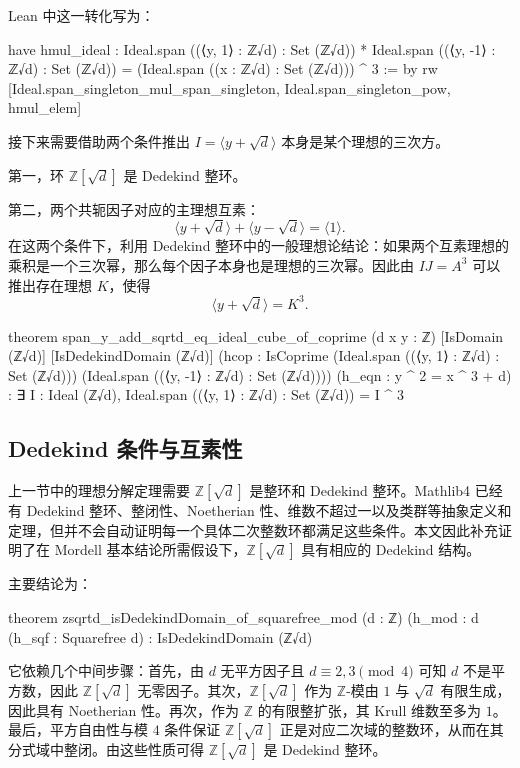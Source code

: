 Lean 中这一转化写为：
\begin{leanlisting}
have hmul_ideal :
    Ideal.span ({(⟨y, 1⟩ : ℤ√d)} : Set (ℤ√d)) *
      Ideal.span ({(⟨y, -1⟩ : ℤ√d)} : Set (ℤ√d)) =
        (Ideal.span ({(x : ℤ√d)} : Set (ℤ√d))) ^ 3 := by
  rw [Ideal.span_singleton_mul_span_singleton,
      Ideal.span_singleton_pow,
      hmul_elem]
\end{leanlisting}

接下来需要借助两个条件推出 \(I=\langle y+\sqrt d\rangle\) 本身是某个理想的三次方。

第一，环 \(\mathbb Z[\sqrt d]\) 是 Dedekind 整环。

第二，两个共轭因子对应的主理想互素：
\[
\langle y+\sqrt d\rangle+\langle y-\sqrt d\rangle=\langle 1\rangle.
\]
在这两个条件下，利用 Dedekind 整环中的一般理想论结论：如果两个互素理想的乘积是一个三次幂，那么每个因子本身也是理想的三次幂。因此由 \(IJ=A^3\) 可以推出存在理想 \(K\)，使得
\[
\langle y+\sqrt d\rangle=K^3.
\]

\begin{leanlisting}
theorem span_y_add_sqrtd_eq_ideal_cube_of_coprime
    (d x y : ℤ) [IsDomain (ℤ√d)] [IsDedekindDomain (ℤ√d)]
    (hcop : IsCoprime
      (Ideal.span ({(⟨y, 1⟩ : ℤ√d)} : Set (ℤ√d)))
      (Ideal.span ({(⟨y, -1⟩ : ℤ√d)} : Set (ℤ√d))))
    (h_eqn : y ^ 2 = x ^ 3 + d) :
    ∃ I : Ideal (ℤ√d),
      Ideal.span ({(⟨y, 1⟩ : ℤ√d)} : Set (ℤ√d)) = I ^ 3
\end{leanlisting}

\subsection{Dedekind 条件与互素性}

上一节中的理想分解定理需要 \(\mathbb Z[\sqrt d]\) 是整环和 Dedekind 整环。Mathlib4 已经有 Dedekind 整环、整闭性、Noetherian 性、维数不超过一以及类群等抽象定义和定理，但并不会自动证明每一个具体二次整数环都满足这些条件。本文因此补充证明了在 Mordell 基本结论所需假设下，\(\mathbb Z[\sqrt d]\) 具有相应的 Dedekind 结构。

主要结论为：
\begin{leanlisting}
theorem zsqrtd_isDedekindDomain_of_squarefree_mod
    (d : ℤ) (h_mod : d %
    (h_sqf : Squarefree d) :
    IsDedekindDomain (ℤ√d)
\end{leanlisting}

它依赖几个中间步骤：首先，由 \(d\) 无平方因子且 \(d\equiv2,3\pmod4\) 可知 \(d\) 不是平方数，因此 \(\mathbb Z[\sqrt d]\) 无零因子。其次，\(\mathbb Z[\sqrt d]\) 作为 \(\mathbb Z\)-模由 \(1\) 与 \(\sqrt d\) 有限生成，因此具有 Noetherian 性。再次，作为 \(\mathbb Z\) 的有限整扩张，其 Krull 维数至多为 \(1\)。最后，平方自由性与模 \(4\) 条件保证 \(\mathbb Z[\sqrt d]\) 正是对应二次域的整数环，从而在其分式域中整闭。由这些性质可得 \(\mathbb Z[\sqrt d]\) 是 Dedekind 整环。

